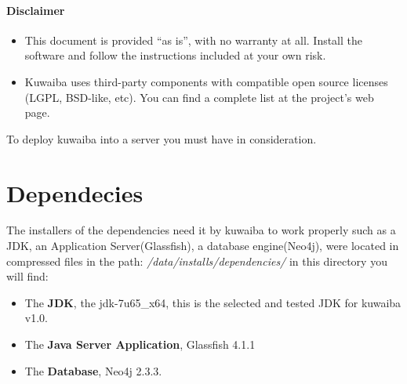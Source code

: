 \documentclass[a4paper]{article}
\begin{document}
		\paragraph{Disclaimer} \hspace{0pt}
		\begin{itemize}
			
		
			\item This document is provided “as is”, with no warranty at all. Install the software and follow the instructions included at your own risk.
			
			\item Kuwaiba uses third-party components with compatible open source licenses (LGPL, BSD-like, etc). You can find a complete list at the project's web page.
		\end{itemize}
	
	\newpage
   	
   	To deploy kuwaiba into a server you must have in consideration.

	\section{Dependecies} \label{sec:dependencies}
		The installers of the dependencies need it by kuwaiba to work properly such as a JDK, an Application Server(Glassfish), a database engine(Neo4j), were located in compressed files in the path: \textit{/data/installs/dependencies/} in this directory you will find:
		\begin{itemize}
			\item The \textbf{JDK}, the jdk-7u65\_x64, this is the selected and tested JDK for kuwaiba v1.0.
			\item The \textbf{Java Server Application}, Glassfish 4.1.1
			\item The \textbf{Database}, Neo4j 2.3.3.
		\end{itemize}
	
\end{document}
